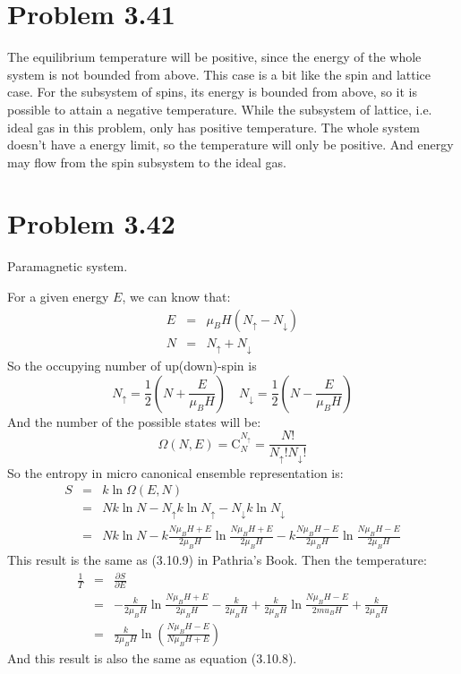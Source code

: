 \documentclass{article}
\begin{document}
\section*{Problem 3.41}
The equilibrium temperature will be positive, since the energy of the whole system is not bounded from above. This case is a bit like the spin and lattice case. For the subsystem of spins, its energy is bounded from above, so it is possible to attain a negative temperature. While the subsystem of lattice, i.e. ideal gas in this problem, only has positive temperature. The whole system doesn't have a energy limit, so the temperature will only be positive. And energy may flow from the spin subsystem to the ideal gas.

\section*{Problem 3.42}
Paramagnetic system.

For a given energy $E$, we can know that:
\begin{eqnarray}
E &=& \mu_B H (N_{\uparrow}-N_\downarrow)\\
N &=& N_\uparrow + N_\downarrow
\end{eqnarray}
So the occupying number of up(down)-spin is
$$
N_\uparrow = \frac{1}{2}\left(N+\frac{E}{\mu_B H}\right)\quad N_\downarrow = \frac{1}{2}\left(N-\frac{E}{\mu_B H}\right)
$$
And the number of the possible states will be:
\begin{equation}
\Omega(N,E) = \mathrm{C}_{N}^{N_\uparrow}=\frac{N!}{N_\uparrow !N_\downarrow!}
\end{equation}
So the entropy in micro canonical ensemble representation is:
\begin{eqnarray}
S &=& k\ln\Omega(E,N) \nonumber\\
&=& Nk\ln N -N_\uparrow k \ln N_\uparrow - N_\downarrow k \ln N_\downarrow\nonumber\\
&=& Nk\ln N -k\frac{N\mu_B H +E}{2\mu_B H}\ln \frac{N\mu_B H +E}{2\mu_B H}-k\frac{N\mu_B H -E}{2\mu_B H}\ln\frac{N\mu_B H -E}{2\mu_B H}
\end{eqnarray}
This result is the same as (3.10.9) in Pathria's Book. Then the temperature:
\begin{eqnarray}
\frac{1}{T} &=& \frac{\partial S}{\partial E}\nonumber\\
&=&-\frac{k}{2\mu_B H}\ln \frac{N\mu_B H +E}{2\mu_B H}-\frac{k}{2\mu_B H}+\frac{k}{2\mu_BH}\ln\frac{N\mu_B H-E}{2
mu_B H}+\frac{k}{2\mu_BH}\nonumber\\
&=&\frac{k}{2\mu_BH}\ln\left(\frac{N\mu_BH-E}{N\mu_BH+E}\right)
\end{eqnarray}
And this result is also the same as equation (3.10.8).
\end{document}
